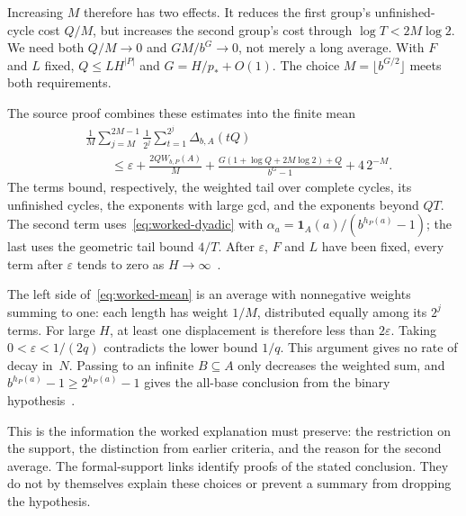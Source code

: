 \documentclass[10pt]{article}
\begin{document}
Increasing $M$ therefore has two effects. It reduces the first group's unfinished-cycle cost $Q/M$, but increases the second group's cost through $\log T<2M\log2$. We need both $Q/M\to0$ and $GM/b^G\to0$, not merely a long average. With $F$ and $L$ fixed, $Q\le LH^{|P|}$ and $G=H/p_*+O(1)$. The choice $M=\lfloor b^{G/2}\rfloor$ meets both requirements.

The source proof combines these estimates into the finite mean
\begin{equation}\label{eq:worked-mean}
\begin{aligned}
 &\frac1M\sum_{j=M}^{2M-1}\frac1{2^j}
       \sum_{t=1}^{2^j}\Delta_{b,A}(tQ)\\
 &\qquad\le \varepsilon+\frac{2QW_{b,P}(A)}M
       +\frac{G(1+\log Q+2M\log2)+Q}{b^G-1}+4\,2^{-M}.
\end{aligned}
\end{equation}
The terms bound, respectively, the weighted tail over complete cycles, its unfinished cycles, the exponents with large gcd, and the exponents beyond $QT$. The second term uses~\eqref{eq:worked-dyadic} with $\alpha_a=\mathbf1_A(a)/(b^{h_P(a)}-1)$; the last uses the geometric tail bound $4/T$. After $\varepsilon$, $F$ and $L$ have been fixed, every term after $\varepsilon$ tends to zero as $H\to\infty$~\cite[Section~2, weighted-support proof]{paper257}.

The left side of~\eqref{eq:worked-mean} is an average with nonnegative weights summing to one: each length has weight $1/M$, distributed equally among its $2^j$ terms. For large $H$, at least one displacement is therefore less than $2\varepsilon$. Taking $0<\varepsilon<1/(2q)$ contradicts the lower bound $1/q$. This argument gives no rate of decay in~$N$. Passing to an infinite $B\subseteq A$ only decreases the weighted sum, and $b^{h_P(a)}-1\ge2^{h_P(a)}-1$ gives the all-base conclusion from the binary hypothesis~\cite[Section~2]{paper257}.

This is the information the worked explanation must preserve: the restriction on the support, the distinction from earlier criteria, and the reason for the second average. The formal-support links identify proofs of the stated conclusion. They do not by themselves explain these choices or prevent a summary from dropping the hypothesis.
\par{}
\end{document}
